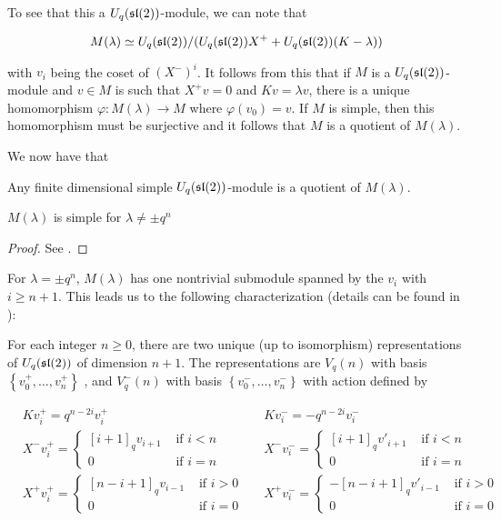 To see that this a $U_q(\mathfrak{sl}(2))$-module, we can note that 

\begin{equation}
    M(\lambda) \simeq U_q(\mathfrak{sl}(2))/(U_q(\mathfrak{sl}(2)) X^+  + U_q(\mathfrak{sl}(2))(K-\lambda))
\end{equation}

with $v_i$ being the coset of $(X^-)^i$. It follows from this that if $M$ is a
$U_q(\mathfrak{sl}(2))$-module and $v \in M$ is such that $X^+ v = 0$ and $Kv = \lambda v$, there
is a unique homomorphism $\varphi: M(\lambda) \to M$ where $\varphi(v_0) = v$.
If $M$ is simple, then this homomorphism must be  surjective and it follows
that $M$ is a quotient of $M(\lambda)$. 

We now have that 
\begin{claim}
    Any finite dimensional simple $U_q(\mathfrak{sl}(2))$-module is a quotient of $M(\lambda)$.
\end{claim}

\begin{claim}
    $M(\lambda)$ is simple for $\lambda \neq \pm q^n$
\end{claim}

\begin{proof}
    See \cite{Jantzen1995}.
\end{proof}

For $\lambda = \pm q^{n}$, $M(\lambda)$ has one nontrivial submodule spanned by the $v_i$ with $i \geq n+1$.
This leads us to the following characterization (details can be found in \cite{Jantzen1995}):


For each integer $n \geq 0$, there are two unique (up to isomorphism)
representations of $U_q(\mathfrak{sl}(2))$ of dimension $n+1$. 
The representations are $V_q(n)$ with basis $\left\{ v^+_0, \ldots, v^+_n
\right\}$ , and $V_q^-(n)$ with basis $\left\{ v^-_0, \ldots, v^-_n \right\}$
with action defined by 

\begin{align*}
    &K v^+_i = q^{n-2i} v^+_i  &
    &K v^-_i = -q^{n-2i} v^-_i \\
    &X^- v^+_i = \begin{cases} [i+1]_qv_{i+1}& \text{ if $i < n$} \\ 0& \text{ if $i = n$} \end{cases} &
    &X^- v^-_i = \begin{cases} [i+1]_qv'_{i+1}& \text{ if $i < n$} \\ 0& \text{ if $i = n$} \end{cases} \\
    & X^+  v^+_i = \begin{cases} 
                     [n-i+1]_qv_{i-1}& \text{ if $i > 0$} \\ 
                    0& \text{ if $i = 0$} 
             \end{cases} &
    & X^+  v^-_i = \begin{cases} 
                    -[n-i+1]_q v'_{i-1}& \text{ if $i > 0$} \\ 
                    0& \text{ if $i = 0$} 
             \end{cases}
\end{align*}

